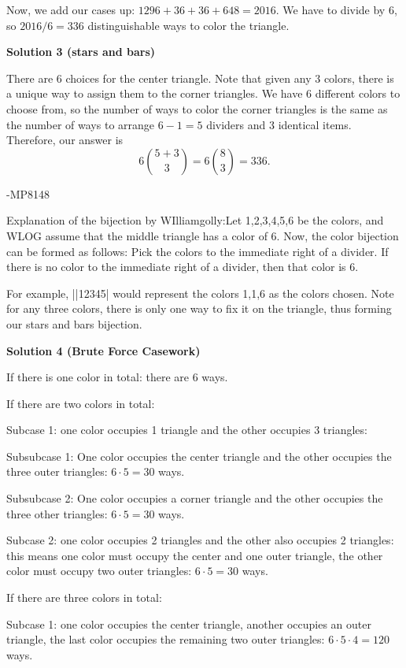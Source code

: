 \begin{enumerate}
 
Now, we add our cases up: $1296+36+36+648=2016$. We have to divide by 6, so $2016/6=\boxed{336}$ distinguishable ways to color the triangle.

 



\textbf{Solution 3 (stars and bars)}

There are $6$ choices for the center triangle. Note that given any $3$ colors, there is a unique way to assign them to the corner triangles. We have $6$ different colors to choose from, so the number of ways to color the corner triangles is the same as the number of ways to arrange $6 - 1 = 5$ dividers and $3$ identical items. Therefore, our answer is 
 \[6 \binom{5 + 3}{3} = 6\binom{8}{3} = \boxed{336}.\]

 -MP8148

 Explanation of the bijection by WIlliamgolly:Let 1,2,3,4,5,6 be the colors, and WLOG assume that the middle triangle has a color of 6.  Now, the color bijection can be formed as follows: Pick the colors to the immediate right of a divider.  If there is no color to the immediate right of a divider, then that color is 6.  

 For example, ||12345| would represent the colors 1,1,6 as the colors chosen. Note for any three colors, there is only one way to fix it on the triangle, thus forming our stars and bars bijection.

 



\textbf{Solution 4 (Brute Force Casework)}

If there is one color in total: there are $6$ ways.

 
If there are two colors in total:

 
Subcase 1: one color occupies 1 triangle and the other occupies 3 triangles:

 
Subsubcase 1: One color occupies the center triangle and the other occupies the three outer triangles: $6\cdot5=30$ ways.

 Subsubcase 2: One color occupies a corner triangle and the other occupies the three other triangles: $6\cdot5=30$ ways.

 
Subcase 2: one color occupies 2 triangles and the other also occupies 2 triangles: this means one color must occupy the center and one outer triangle, the other color must occupy two outer triangles: $6\cdot5=30$ ways.

 
If there are three colors in total:

 Subcase 1: one color occupies the center triangle, another occupies an outer triangle, the last color occupies the remaining two outer triangles: $6\cdot5\cdot4=120$ ways.


\end{enumerate}
